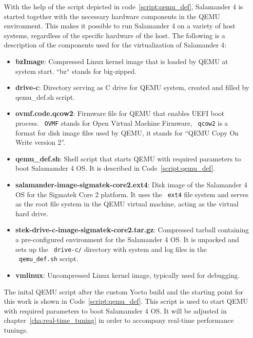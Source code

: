 \documentclass[MMR,Master,english]{twbook}
\begin{document}
\noindent With the help of the script depicted in code~\ref{script:qemu_def}, Salamander 4 is started together with the necessary hardware components in the QEMU environment. This makes it possible to run Salamander 4 on a variety of host systems, regardless of the specific hardware of the host. The following is a description of the components used for the virtualization of Salamander 4:
\begin{itemize}
	\item \textbf{bzImage}: Compressed Linux kernel image that is loaded by QEMU at system start. ``bz`` stands for big-zipped.
	\item \textbf{drive-c}: Directory serving as C drive for QEMU system, created and filled by qemu\_def.sh script.
	\item \textbf{ovmf.code.qcow2}: Firmware file for QEMU that enables UEFI boot process. ~\texttt{OVMF} stands for Open Virtual Machine Firmware, ~\texttt{qcow2} is a format for disk image files used by QEMU, it stands for ``QEMU Copy On Write version 2''.
	\item \textbf{qemu\_def.sh}: Shell script that starts QEMU with required parameters to boot Salamamder 4 OS. It is described in Code~\ref{script:qemu_def}.
	\item \textbf{salamander-image-sigmatek-core2.ext4}: Disk image of the Salamander 4 OS for the Sigmatek Core 2 platform. It uses the ~\texttt{ext4} file system and serves as the root file system in the QEMU virtual machine, acting as the virtual hard drive.
	\item \textbf{stek-drive-c-image-sigmatek-core2.tar.gz}: Compressed tarball containing a pre-configured environment for the Salamander 4 OS. It is unpacked and sets up the ~\texttt{drive-c/} directory with system and log files in the ~\texttt{qemu\_def.sh} script. 
	\item \textbf{vmlinux}: Uncompressed Linux kernel image, typically used for debugging.
\end{itemize}

\noindent The inital QEMU script after the custom Yocto build and the starting point for this work is shown in Code~\ref{script:qemu_def}. This script is used to start QEMU with required parameters to boot Salamamder 4 OS. It will be adjusted in chapter~\ref{cha:real-time_tuning} in order to accompany real-time performance tunings. 
\end{document}
